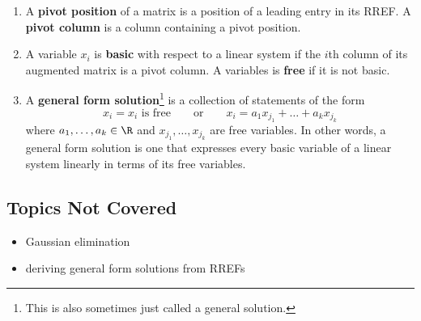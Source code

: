 \begin{enumerate}
\item A \textbf{pivot position} of a matrix is a position of a leading
  entry in its RREF.  A \textbf{pivot column} is a column containing a
  pivot position.
\item A variable $x_i$ is \textbf{basic} with respect to a linear
  system if the $i$th column of its augmented matrix is a pivot
  column.  A variables is \textbf{free} if it is not basic.
\item A \textbf{general form solution}\footnote{This is also
sometimes just called a general solution.} is a collection of statements of the form
  \begin{displaymath}
    x_i = x_i \text{ is free} \qquad \text{or} \qquad x_i = a_1x_{j_1} + \dots + a_kx_{j_k}
  \end{displaymath}
  where $a_{1}, \dots, a_{k} \in \R$ and $x_{j_1}, \dots, x_{j_k}$ are
  free variables.  In other words, a general form solution is one that
  expresses every basic variable of a linear system linearly in terms
  of its free variables.
\end{enumerate}

\subsection*{Topics Not Covered}

\begin{itemize}
\item Gaussian elimination
\item deriving general form solutions from RREFs
\end{itemize}

